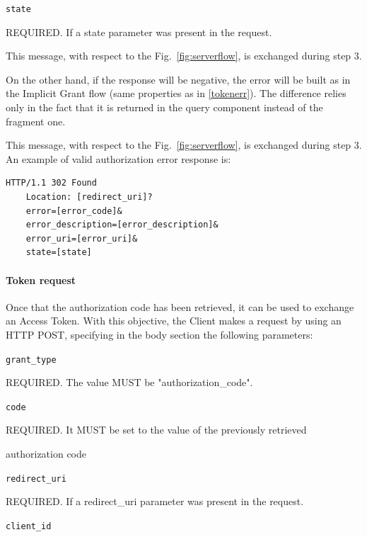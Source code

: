 \documentclass[a4paper,12pt]{article}
\def\myfig#1{Fig.~#1\xspace}
\begin{document}
\texttt{state}

\hspace{0.5cm}REQUIRED. If a state parameter was present in the request.

\vspace{0.5cm}

\noindent This message, with respect to the \myfig{\ref{fig:serverflow}}, is exchanged during step 3. 

\vspace{0.5cm}

On the other hand, if the response will be negative, the error will be built as in the Implicit Grant flow (same properties as in \ref{tokenerr}). The difference relies only in the fact that it is returned in the query component instead of the fragment one.

This message, with respect to the \myfig{\ref{fig:serverflow}}, is exchanged during step 3. An example of valid authorization error response is:

\begin{lstlisting}[basicstyle=\ttfamily]
  HTTP/1.1 302 Found
    Location: [redirect_uri]?
    error=[error_code]&
    error_description=[error_description]&
    error_uri=[error_uri]&
    state=[state]
\end{lstlisting}

\paragraph{Token request}
Once that the authorization code has been retrieved, it can be used to exchange an Access Token. With this objective, the Client makes a request by using an HTTP POST, specifying in the body section the following parameters:

\texttt{grant\_type}

\hspace{0.5cm}REQUIRED. The value MUST be "authorization\_code".

\texttt{code}

\hspace{0.5cm}REQUIRED. It MUST be set to the value of the previously retrieved

\hspace{0.5cm}authorization code

\texttt{redirect\_uri}

\hspace{0.5cm}REQUIRED. If a redirect\_uri parameter was present in the request.

\texttt{client\_id}
\end{document}

